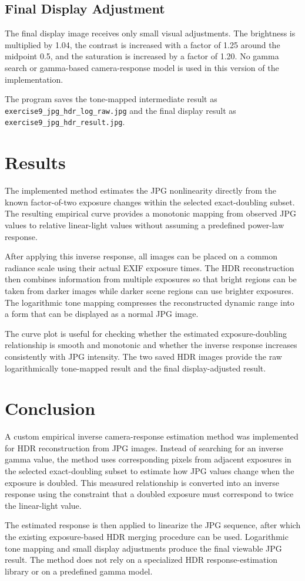 \documentclass[11pt,a4paper]{article}
\begin{document}
\subsection{Final Display Adjustment}

The final display image receives only small visual adjustments. The brightness is multiplied by 1.04, the contrast is increased with a factor of 1.25 around the midpoint 0.5, and the saturation is increased by a factor of 1.20. No gamma search or gamma-based camera-response model is used in this version of the implementation.

The program saves the tone-mapped intermediate result as \texttt{exercise9\_jpg\_hdr\_log\_raw.jpg} and the final display result as \texttt{exercise9\_jpg\_hdr\_result.jpg}.

\section{Results}

The implemented method estimates the JPG nonlinearity directly from the known factor-of-two exposure changes within the selected exact-doubling subset. The resulting empirical curve provides a monotonic mapping from observed JPG values to relative linear-light values without assuming a predefined power-law response.

After applying this inverse response, all images can be placed on a common radiance scale using their actual EXIF exposure times. The HDR reconstruction then combines information from multiple exposures so that bright regions can be taken from darker images while darker scene regions can use brighter exposures. The logarithmic tone mapping compresses the reconstructed dynamic range into a form that can be displayed as a normal JPG image.

The curve plot is useful for checking whether the estimated exposure-doubling relationship is smooth and monotonic and whether the inverse response increases consistently with JPG intensity. The two saved HDR images provide the raw logarithmically tone-mapped result and the final display-adjusted result.

\section{Conclusion}

A custom empirical inverse camera-response estimation method was implemented for HDR reconstruction from JPG images. Instead of searching for an inverse gamma value, the method uses corresponding pixels from adjacent exposures in the selected exact-doubling subset to estimate how JPG values change when the exposure is doubled. This measured relationship is converted into an inverse response using the constraint that a doubled exposure must correspond to twice the linear-light value.

The estimated response is then applied to linearize the JPG sequence, after which the existing exposure-based HDR merging procedure can be used. Logarithmic tone mapping and small display adjustments produce the final viewable JPG result. The method does not rely on a specialized HDR response-estimation library or on a predefined gamma model.
\end{document}
